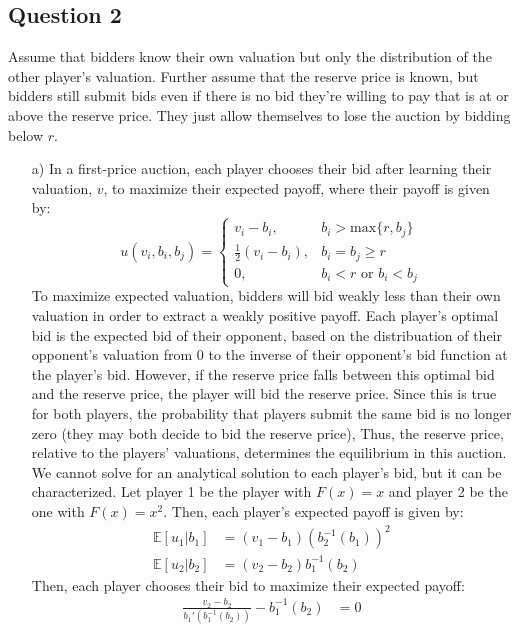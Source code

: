 \documentclass{article}
\newcommand{\E}[1]{\mathbb{E}\left[#1\right]} %
\begin{document}

\subsection*{Question 2}
Assume that bidders know their own valuation but only the distribution of the other player's valuation. Further assume that the reserve price is known, but bidders still submit bids even if there is no bid they're willing to pay that is at or above the reserve price. They just allow themselves to lose the auction by bidding below $r$.
\begin{itemize}
	\item[a)]  In a first-price auction, each player chooses their bid after learning their valuation, $v$, to maximize their expected payoff, where their payoff is given by:
		\[
			u(v_i,b_i,b_j) = 	\begin{cases}
									v_i-b_i, 				&b_i > \text{max}\{r,b_j\}	\\
									\frac{1}{2}(v_i-b_i),	&b_i = b_j \geq r			\\
									0,						&b_i < r\text{ or } b_i < b_j
								\end{cases}
		\]
	To maximize expected valuation, bidders will bid weakly less than their own valuation in order to extract a weakly positive payoff. Each player's optimal bid is the expected bid of their opponent, based on the distribuation of their opponent's valuation from 0 to the inverse of their opponent's bid function at the player's bid. However, if the reserve price falls between this optimal bid and the reserve price, the player will bid the reserve price. Since this is true for both players, the probability that players submit the same bid is no longer zero (they may both decide to bid the reserve price), Thus, the reserve price, relative to the players' valuations, determines the equilibrium in this auction. We cannot solve for an analytical solution to each player's bid, but it can be characterized. Let player 1 be the player with ${F(x)=x}$ and player 2 be the one with ${F(x)=x^2}$. Then, each player's expected payoff is given by:
	\begin{align*}
		\E{u_1|b_1}	&= (v_1-b_1)\left(b_2^{-1}(b_1)\right)^2	\\
		\E{u_2|b_2}	&= (v_2-b_2)b_1^{-1}(b_2)
	\end{align*}
	Then, each player chooses their bid to maximize their expected payoff:
	\begin{align*}
		\frac{v_2-b_2}{b_1'\left(b_1^{-1}(b_2)\right)} - b_1^{-1}(b_2) 		&= 0	\\

\end{align*}
\end{itemize}
\end{document}
